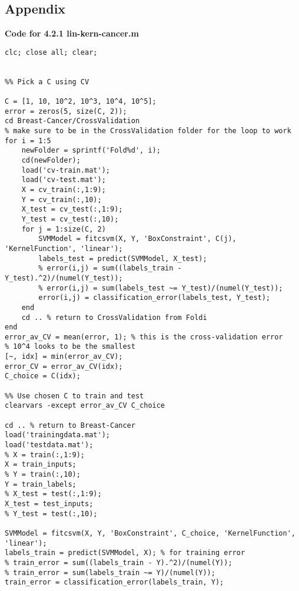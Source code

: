 \documentclass[english]{article}
\begin{document}
\begin{enumerate}

\end{enumerate}

\subsection{Appendix}
\textbf{Code for 4.2.1 lin-kern-cancer.m}
\color{red}
\begin{verbatim}
clc; close all; clear;


%% Pick a C using CV

C = [1, 10, 10^2, 10^3, 10^4, 10^5];
error = zeros(5, size(C, 2));
cd Breast-Cancer/CrossValidation
% make sure to be in the CrossValidation folder for the loop to work
for i = 1:5
    newFolder = sprintf('Fold%d', i);
    cd(newFolder);
    load('cv-train.mat');
    load('cv-test.mat');
    X = cv_train(:,1:9);
    Y = cv_train(:,10);
    X_test = cv_test(:,1:9);
    Y_test = cv_test(:,10);
    for j = 1:size(C, 2)
        SVMModel = fitcsvm(X, Y, 'BoxConstraint', C(j), 'KernelFunction', 'linear');
        labels_test = predict(SVMModel, X_test);
        % error(i,j) = sum((labels_train - Y_test).^2)/(numel(Y_test));
        % error(i,j) = sum(labels_test ~= Y_test)/(numel(Y_test));
        error(i,j) = classification_error(labels_test, Y_test);
    end
    cd .. % return to CrossValidation from Foldi
end
error_av_CV = mean(error, 1); % this is the cross-validation error
% 10^4 looks to be the smallest
[~, idx] = min(error_av_CV);
error_CV = error_av_CV(idx);
C_choice = C(idx);

%% Use chosen C to train and test
clearvars -except error_av_CV C_choice

cd .. % return to Breast-Cancer
load('trainingdata.mat');
load('testdata.mat');
% X = train(:,1:9);
X = train_inputs;
% Y = train(:,10);
Y = train_labels;
% X_test = test(:,1:9);
X_test = test_inputs;
% Y_test = test(:,10);

SVMModel = fitcsvm(X, Y, 'BoxConstraint', C_choice, 'KernelFunction', 'linear');
labels_train = predict(SVMModel, X); % for training error
% train_error = sum((labels_train - Y).^2)/(numel(Y));
% train_error = sum(labels_train ~= Y)/(numel(Y));
train_error = classification_error(labels_train, Y);


\end{verbatim}
\end{document}
